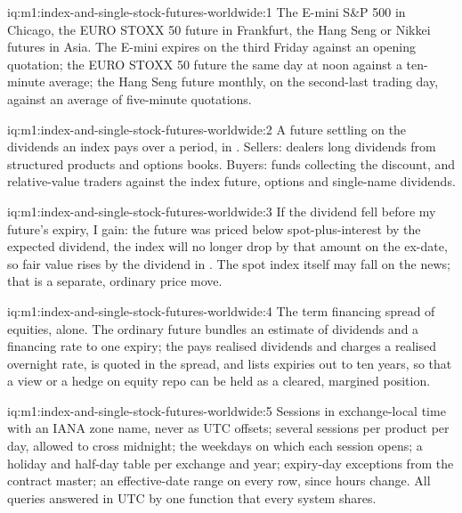 \begin{solution}{iq:m1:index-and-single-stock-futures-worldwide:1}
The E-mini S\&P 500 in Chicago, the EURO STOXX 50 future in Frankfurt, the
Hang Seng or Nikkei futures in Asia. The E-mini expires on the third Friday
against an opening quotation; the EURO STOXX 50 future the same day at noon
against a ten-minute average; the Hang Seng future monthly, on the
second-last trading day, against an average of five-minute quotations.
\end{solution}

\begin{solution}{iq:m1:index-and-single-stock-futures-worldwide:2}
A future settling on the dividends an index pays over a period, in . Sellers: dealers long dividends from structured products and
options books. Buyers: funds collecting the discount, and relative-value
traders against the index future, options and single-name dividends.
\end{solution}

\begin{solution}{iq:m1:index-and-single-stock-futures-worldwide:3}
If the dividend fell before my future's expiry, I gain: the future was
priced below spot-plus-interest by the expected dividend, the index will no
longer drop by that amount on the ex-date, so fair value rises by the
dividend in . The spot index itself may fall on the news; that
is a separate, ordinary price move.
\end{solution}

\begin{solution}{iq:m1:index-and-single-stock-futures-worldwide:4}
The term financing spread of equities, alone. The ordinary future bundles an
estimate of dividends and a financing rate to one expiry; the  pays realised dividends and charges a realised overnight rate, is
quoted in the spread, and lists expiries out to ten years, so that a view or
a hedge on equity repo can be held as a cleared, margined position.
\end{solution}

\begin{solution}{iq:m1:index-and-single-stock-futures-worldwide:5}
Sessions in exchange-local time with an IANA zone name, never as UTC
offsets; several sessions per product per day, allowed to cross midnight;
the weekdays on which each session opens; a holiday and half-day table per
exchange and year; expiry-day exceptions from the contract master; an
effective-date range on every row, since hours change. All queries answered
in UTC by one function that every system shares.
\end{solution}

